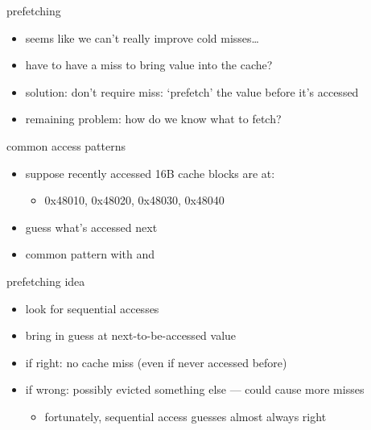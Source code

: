 \begin{frame}{prefetching}
    \begin{itemize}
    \item seems like we can't really improve cold misses\ldots
    \item have to have a miss to bring value into the cache?
    \vspace{.5cm}
    \item<2-> solution: don't require miss: `prefetch' the value before it's accessed
    \item<2-> remaining problem: how do we know what to fetch?
    \end{itemize}
\end{frame}

\begin{frame}{common access patterns}
    \begin{itemize}
    \item suppose recently accessed 16B cache blocks are at:
        \begin{itemize}
        \item 0x48010, 0x48020, 0x48030, 0x48040
        \end{itemize}
    \item guess what's accessed next
    \vspace{.5cm}
    \item<2-> common pattern with  and 
    \end{itemize}
\end{frame}

\begin{frame}{prefetching idea}
\begin{itemize}
\item look for sequential accesses
\item bring in guess at next-to-be-accessed value
\item if right: no cache miss (even if never accessed before)
\item if wrong: possibly evicted something else --- could cause more misses
    \begin{itemize}
    \item fortunately, sequential access guesses almost always right
    \end{itemize}
\end{itemize}
\end{frame}
